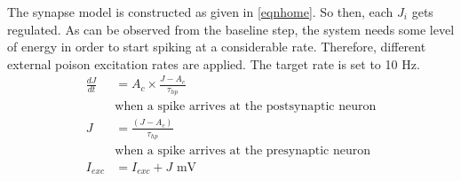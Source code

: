 \documentclass[a4paper,12pt]{article}
\begin{document}
The synapse model is constructed as given in \ref{eqnhome}. So then, each $J_i$ gets regulated. As can be observed from the baseline step, the system needs some level of energy in order to start spiking at a considerable rate. Therefore, different external poison excitation rates are applied. The target rate is set to 10 Hz. 
\begin{equation}
    \begin{split}
        \frac{dJ}{dt} &= A_c \times \frac{J-A_c}{\tau_{hp}} \\
        &\text{when a spike arrives at the postsynaptic neuron} \\
        J &= \frac{(J-A_c)}{\tau_{hp}} \\
        &\text{when a spike arrives at the presynaptic neuron}\\
        I_{exc} &= I_{exc} + J \text{  mV} \\
    \end{split}
    \label{eqnhome}
\end{equation}
\end{document}
